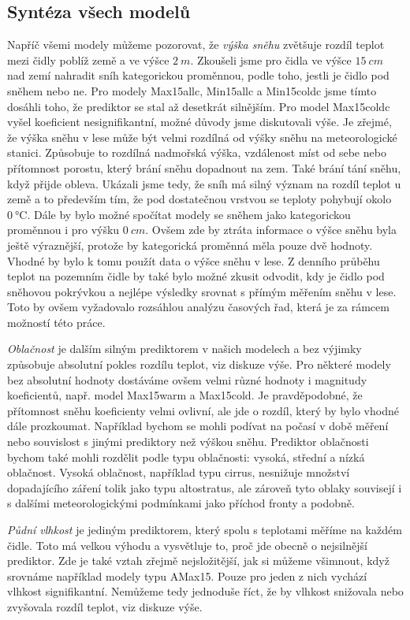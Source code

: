 \subsection{Syntéza všech modelů}
Napříč všemi modely můžeme pozorovat, že \textit{výška sněhu} zvětšuje rozdíl teplot mezi čidly poblíž země a ve výšce $\SI{2}{m}$. Zkoušeli jsme pro čidla ve výšce $\SI{15}{cm}$ nad zemí nahradit sníh kategorickou proměnnou, podle toho, jestli je čidlo pod sněhem nebo ne. Pro modely Max15allc, Min15allc a Min15coldc jsme tímto dosáhli toho, že prediktor se stal až desetkrát silnějším. Pro model Max15coldc vyšel koeficient nesignifikantní, možné důvody jsme diskutovali výše. Je zřejmé, že výška sněhu v lese může být velmi rozdílná od výšky sněhu na meteorologické stanici. Způsobuje to rozdílná nadmořská výška, vzdálenost míst od sebe nebo přítomnost porostu, který brání sněhu dopadnout na zem. Také brání tání sněhu, když přijde obleva. Ukázali jsme tedy, že sníh má silný význam na rozdíl teplot u země a to především tím, že pod dostatečnou vrstvou se teploty pohybují okolo $\SI{0}{\celsius}$. Dále by bylo možné spočítat modely se sněhem jako kategorickou proměnnou i pro výšku $\SI{0}{cm}$. Ovšem zde by ztráta informace o výšce sněhu byla ještě výraznější, protože by kategorická proměnná měla pouze dvě hodnoty. Vhodné by bylo k tomu použít data o výšce sněhu v lese. Z denního průběhu teplot na pozemním čidle by také bylo možné zkusit odvodit, kdy je čidlo pod sněhovou pokrývkou a nejlépe výsledky srovnat s přímým měřením sněhu v lese. Toto by ovšem vyžadovalo rozsáhlou analýzu časových řad, která je za rámcem možností této práce.

\textit{Oblačnost} je dalším silným prediktorem v našich modelech a bez výjimky způsobuje absolutní pokles rozdílu teplot, viz diskuze výše. Pro některé modely bez absolutní hodnoty dostáváme ovšem velmi různé hodnoty i magnitudy koeficientů, např. model Max15warm a Max15cold. Je pravděpodobné, že přítomnost sněhu koeficienty velmi ovlivní, ale jde o rozdíl, který by bylo vhodné dále prozkoumat. Například bychom se mohli podívat na počasí v době měření nebo souvislost s jinými prediktory než výškou sněhu. Prediktor oblačnosti bychom také mohli rozdělit podle typu oblačnosti: vysoká, střední a nízká oblačnost. Vysoká oblačnost, například typu cirrus, nesnižuje množství dopadajícího záření tolik jako typu altostratus, ale zároveň tyto oblaky souvisejí i s dalšími meteorologickými podmínkami jako příchod fronty a podobně.

\textit{Půdní vlhkost} je jediným prediktorem, který spolu s teplotami měříme na každém čidle. Toto má velkou výhodu a vysvětluje to, proč jde obecně o nejsilnější prediktor. Zde je také vztah zřejmě nejsložitější, jak si můžeme všimnout, když srovnáme například modely typu AMax15. Pouze pro jeden z nich vychází vlhkost signifikantní. Nemůžeme tedy jednoduše říct, že by vlhkost snižovala nebo zvyšovala rozdíl teplot, viz diskuze výše.

